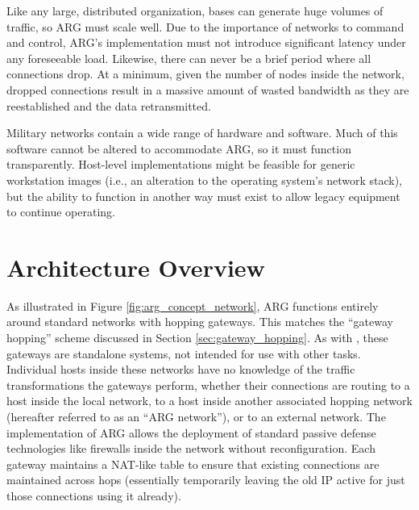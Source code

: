\par Like any large, distributed organization, bases can generate huge volumes of traffic, so ARG must scale well. Due to the importance of networks to command and control, ARG's implementation must not introduce significant latency under any foreseeable load. Likewise, there can never be a brief period where all connections drop. At a minimum, given the number of nodes inside the network, dropped connections result in a massive amount of wasted bandwidth as they are reestablished and the data retransmitted.

\par Military networks contain a wide range of hardware and software. Much of this software cannot be altered to accommodate \ac{ARG}, so it must function transparently. Host-level implementations might be feasible for generic workstation images (i.e., an alteration to the operating system's network stack), but the ability to function in another way must exist to allow legacy equipment to continue operating.


\section{Architecture Overview}
\label{sec:arg_impl_overview}

\par As illustrated in Figure \ref{fig:arg_concept_network}, \ac{ARG} functions entirely around standard networks with hopping gateways. This matches the ``gateway hopping'' scheme discussed in Section \ref{sec:gateway_hopping}. As with \cite{TAO}, these gateways are standalone systems, not intended for use with other tasks. Individual hosts inside these networks have no knowledge of the traffic transformations the gateways perform, whether their connections are routing to a host inside the local network, to a host inside another associated hopping network (hereafter referred to as an ``ARG network''), or to an external network. The implementation of ARG allows the deployment of standard passive defense technologies like firewalls inside the network without reconfiguration. Each gateway maintains a \ac{NAT}-like table to ensure that existing connections are maintained across hops (essentially temporarily leaving the old IP active for just those connections using it already).

